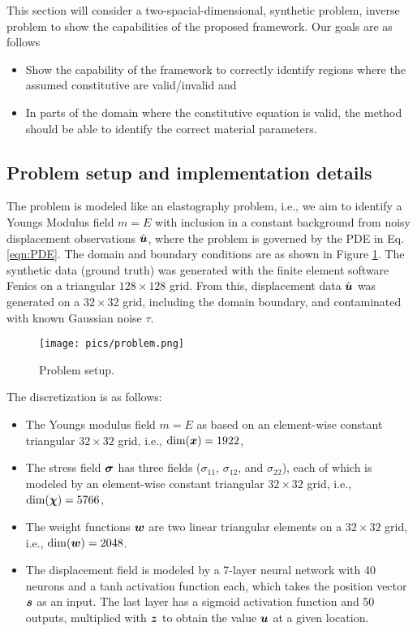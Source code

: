 This section will consider a two-spacial-dimensional, synthetic problem, inverse problem to show the capabilities of the proposed framework. Our goals are as follows
\begin{itemize}
    \item Show the capability of the framework to correctly identify regions where the assumed constitutive are valid/invalid and
    \item In parts of the domain where the constitutive equation is valid, the method should be able to identify the correct material parameters.
\end{itemize}
\subsection{Problem setup and implementation details}
The problem is modeled like an elastography problem, i.e., we aim to identify a Youngs Modulus field $m = E$ with inclusion in a constant background from noisy displacement observations $\hat{\boldsymbol{u}}$, where the problem is governed by the PDE in Eq. \ref{eqn:PDE}. The domain and boundary conditions are as shown in Figure \ref{fig:problem}. The synthetic data (ground truth) was generated with the finite element software Fenics on a triangular $128 \times 128$ grid. From this, displacement data $\hat{\boldsymbol{u}}$ was generated on a $32 \times 32$ grid, including the domain boundary, and contaminated with known Gaussian noise $\tau$.

\begin{figure}
    \centering
    \texttt{[image: pics/problem.png]}
    \caption{Problem setup.}
    \label{fig:problem}
\end{figure}

The discretization is as follows:
\begin{itemize}
    \item The Youngs modulus field $m=E$ as based on an element-wise constant triangular $32 \times 32$ grid, i.e., $\dim(\boldsymbol{x}) = 1922$,
    \item The stress field $\boldsymbol{\sigma}$ has three fields ($\sigma_{11}$, $\sigma_{12}$, and $\sigma_{22}$), each of which is modeled by an element-wise constant triangular $32 \times 32$ grid, i.e., $\dim(\boldsymbol{\chi}) = 5766$,
    \item The weight functions $\boldsymbol{w}$ are two linear triangular elements on a $32 \times 32$ grid, i.e., $\dim(\boldsymbol{w})=2048$.
    \item The displacement field is modeled by a 7-layer neural network with 40 neurons and a tanh activation function each, which takes the position vector $\boldsymbol{s}$ as an input. The last layer has a sigmoid activation function and 50 outputs, multiplied with $\boldsymbol{z}$ to obtain the value $\boldsymbol{u}$ at a given location.
\end{itemize}

